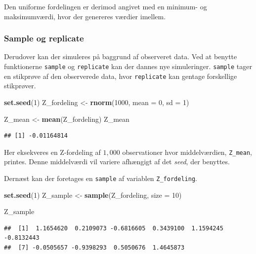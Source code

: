 \documentclass[
]{book}
\newenvironment{Shaded}{\begin{snugshade}}{\end{snugshade}}
\newcommand{\DataTypeTok}[1]{\textcolor[rgb]{0.13,0.29,0.53}{#1}}
\newcommand{\DecValTok}[1]{\textcolor[rgb]{0.00,0.00,0.81}{#1}}
\newcommand{\KeywordTok}[1]{\textcolor[rgb]{0.13,0.29,0.53}{\textbf{#1}}}
\newcommand{\NormalTok}[1]{#1}
\newcommand{\StringTok}[1]{\textcolor[rgb]{0.31,0.60,0.02}{#1}}
\theoremstyle{definition}
\theoremstyle{definition}
\theoremstyle{definition}
\theoremstyle{remark}
\begin{document}
Den uniforme fordelingen er derimod angivet med en minimum- og maksimumværdi, hvor der genereres værdier imellem.

\hypertarget{sample-og-replicate}{%
\subsubsection{Sample og replicate}\label{sample-og-replicate}}

Derudover kan der simuleres på baggrund af observeret data. Ved at benytte funktionerne \texttt{sample} og \texttt{replicate} kan der dannes nye simuleringer. \texttt{sample} tager en stikprøve af den observerede data, hvor \texttt{replicate} kan gentage forskellige stikprøver.

\begin{Shaded}
\begin{Highlighting}[]
\KeywordTok{set.seed}\NormalTok{(}\DecValTok{1}\NormalTok{)}
\NormalTok{Z_fordeling <-}\StringTok{ }\KeywordTok{rnorm}\NormalTok{(}\DecValTok{1000}\NormalTok{, }\DataTypeTok{mean =} \DecValTok{0}\NormalTok{, }\DataTypeTok{sd =} \DecValTok{1}\NormalTok{)}

\NormalTok{Z_mean <-}\StringTok{ }\KeywordTok{mean}\NormalTok{(Z_fordeling)}
\NormalTok{Z_mean}
\end{Highlighting}
\end{Shaded}

\begin{verbatim}
## [1] -0.01164814
\end{verbatim}

Her eksekveres en Z-fordeling af \(1,000\) observationer hvor middelværdien, \texttt{Z\_mean}, printes. Denne middelværdi vil variere afhængigt af det \emph{seed}, der benyttes.

Dernæst kan der foretages en \texttt{sample} af variablen \texttt{Z\_fordeling}.

\begin{Shaded}
\begin{Highlighting}[]
\KeywordTok{set.seed}\NormalTok{(}\DecValTok{1}\NormalTok{)}
\NormalTok{Z_sample <-}\StringTok{ }\KeywordTok{sample}\NormalTok{(Z_fordeling, }\DataTypeTok{size =} \DecValTok{10}\NormalTok{)}

\NormalTok{Z_sample}
\end{Highlighting}
\end{Shaded}

\begin{verbatim}
##  [1]  1.1654620  0.2109073 -0.6816605  0.3439100  1.1594245 -0.8132443
##  [7] -0.0505657 -0.9398293  0.5050676  1.4645873
\end{verbatim}
\end{document}
